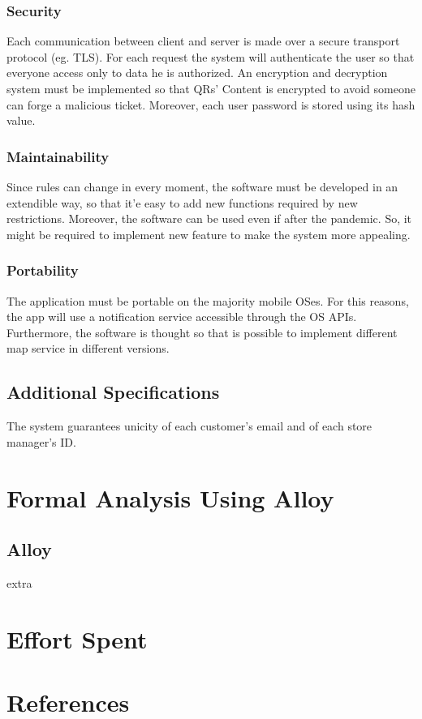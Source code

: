 \documentclass{article}
\begin{document}
		\subsubsection{Security}
		Each communication between client and server is made over a secure transport protocol (eg. TLS). For each request the system will authenticate the user so that everyone access only to data he is authorized. An encryption and decryption system must be implemented so that QRs' Content is encrypted to avoid someone can forge a malicious ticket. Moreover, each user password is stored using its hash value. 
		\subsubsection{Maintainability}
		Since rules can change in every moment, the software must be developed in an extendible way, so that it'e easy to add new functions required by new restrictions. Moreover, the software can be used even if after the pandemic. So, it might be required to implement new feature to make the system more appealing.
		\subsubsection{Portability}
		The application must be portable on the majority mobile OSes. For this reasons, the app will use a notification service accessible through the OS APIs. Furthermore, the software is thought so that is possible to implement different map service in different versions.
		\subsection{Additional Specifications}
	The system guarantees unicity of each customer's email and of each store manager's ID.
	
	
	
\section{Formal Analysis Using Alloy}
	\subsection{Alloy}
	extra
	
	
\section{Effort Spent}

\section{References}	
	
	
	
\end{document}

